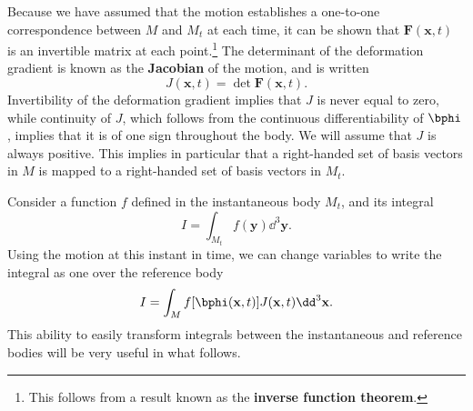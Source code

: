 Because we have assumed that the motion establishes a one-to-one correspondence between $M$ and $M_{t}$ at each time, it can 
be shown that $\mathbf{F}(\mathbf{x},t)$ is an invertible matrix at each point.\footnote{This follows from a result known as 
the \textbf{inverse function theorem}.} The determinant of the deformation gradient is known as the \textbf{Jacobian} of the
motion, and is written
\begin{equation}
J(\mathbf{x},t)=\det\mathbf{F}(\mathbf{x},t).
\label{eq:5}
\end{equation}
Invertibility of the deformation gradient implies that $J$ is never equal to zero, while continuity of $J$, which follows 
from the continuous differentiability of $\bphi$, implies that it is of one sign throughout the body. We will assume that $J$ is always positive. This implies in particular that a right-handed set of 
basis vectors in $M$ is mapped to a right-handed set of basis vectors in $M_{t}$.

Consider a function $f$ defined in the instantaneous body $M_{t}$, and its integral
\begin{equation}
I=\int_{M_{t}}f(\mathbf{y})\dd^{3}\mathbf{y}.
\label{eq:6}
\end{equation}
Using the motion at this instant in time, we can change variables to write the integral as one over the reference body
\begin{equation}
I=\int_{M}f[\bphi(\mathbf{x},t)]J(\mathbf{x},t)\dd^{3}\mathbf{x}.
\label{eq:7}
\end{equation}
This ability to easily transform integrals between the instantaneous and reference bodies will be very useful in what follows.


